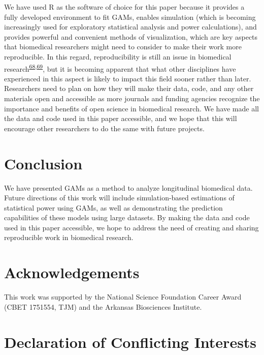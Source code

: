 \documentclass[
]{article}
\begin{document}
We have used R as the software of choice for this paper because it provides a fully developed environment to fit GAMs, enables simulation (which is becoming increasingly used for exploratory statistical analysis and power calculations), and provides powerful and convenient methods of visualization, which are key aspects that biomedical researchers might need to consider to make their work more reproducible. In this regard, reproducibility is still an issue in biomedical research\textsuperscript{\protect\hyperlink{ref-begley2015}{68},\protect\hyperlink{ref-weissgerber2018}{69}}, but it is becoming apparent that what other disciplines have experienced in this aspect is likely to impact this field sooner rather than later. Researchers need to plan on how they will make their data, code, and any other materials open and accessible as more journals and funding agencies recognize the importance and benefits of open science in biomedical research. We have made all the data and code used in this paper accessible, and we hope that this will encourage other researchers to do the same with future projects.

\hypertarget{conclusion}{%
\section{Conclusion}\label{conclusion}}

We have presented GAMs as a method to analyze longitudinal biomedical data. Future directions of this work will include simulation-based estimations of statistical power using GAMs, as well as demonstrating the prediction capabilities of these models using large datasets.
By making the data and code used in this paper accessible, we hope to address the need of creating and sharing reproducible work in biomedical research.

\hypertarget{acknowledgements}{%
\section{Acknowledgements}\label{acknowledgements}}

This work was supported by the National Science Foundation Career Award (CBET 1751554, TJM) and the Arkansas Biosciences Institute.

\hypertarget{declaration-of-conflicting-interests}{%
\section{Declaration of Conflicting Interests}\label{declaration-of-conflicting-interests}}
\end{document}
